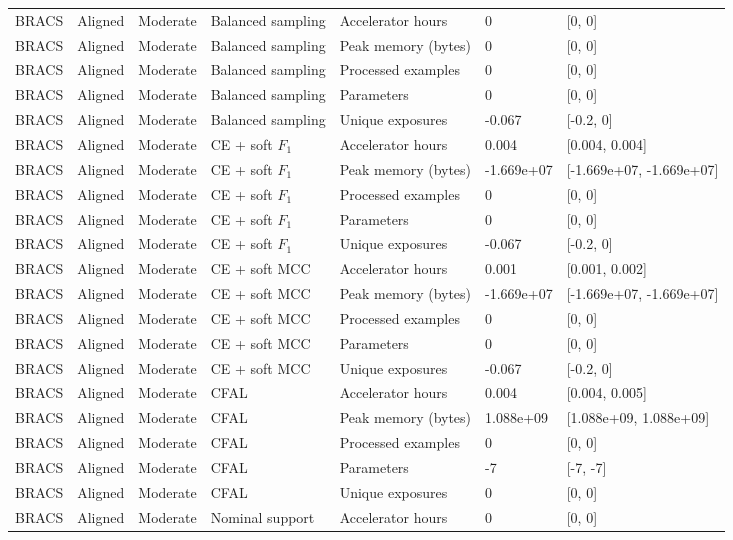 \begin{longtable}{lllllll}
BRACS & Aligned & Moderate & Balanced sampling & Accelerator hours & 0 & [0, 0] \\
BRACS & Aligned & Moderate & Balanced sampling & Peak memory (bytes) & 0 & [0, 0] \\
BRACS & Aligned & Moderate & Balanced sampling & Processed examples & 0 & [0, 0] \\
BRACS & Aligned & Moderate & Balanced sampling & Parameters & 0 & [0, 0] \\
BRACS & Aligned & Moderate & Balanced sampling & Unique exposures & -0.067 & [-0.2, 0] \\
BRACS & Aligned & Moderate & CE + soft $F_1$ & Accelerator hours & 0.004 & [0.004, 0.004] \\
BRACS & Aligned & Moderate & CE + soft $F_1$ & Peak memory (bytes) & -1.669e+07 & [-1.669e+07, -1.669e+07] \\
BRACS & Aligned & Moderate & CE + soft $F_1$ & Processed examples & 0 & [0, 0] \\
BRACS & Aligned & Moderate & CE + soft $F_1$ & Parameters & 0 & [0, 0] \\
BRACS & Aligned & Moderate & CE + soft $F_1$ & Unique exposures & -0.067 & [-0.2, 0] \\
BRACS & Aligned & Moderate & CE + soft MCC & Accelerator hours & 0.001 & [0.001, 0.002] \\
BRACS & Aligned & Moderate & CE + soft MCC & Peak memory (bytes) & -1.669e+07 & [-1.669e+07, -1.669e+07] \\
BRACS & Aligned & Moderate & CE + soft MCC & Processed examples & 0 & [0, 0] \\
BRACS & Aligned & Moderate & CE + soft MCC & Parameters & 0 & [0, 0] \\
BRACS & Aligned & Moderate & CE + soft MCC & Unique exposures & -0.067 & [-0.2, 0] \\
BRACS & Aligned & Moderate & CFAL & Accelerator hours & 0.004 & [0.004, 0.005] \\
BRACS & Aligned & Moderate & CFAL & Peak memory (bytes) & 1.088e+09 & [1.088e+09, 1.088e+09] \\
BRACS & Aligned & Moderate & CFAL & Processed examples & 0 & [0, 0] \\
BRACS & Aligned & Moderate & CFAL & Parameters & -7 & [-7, -7] \\
BRACS & Aligned & Moderate & CFAL & Unique exposures & 0 & [0, 0] \\
BRACS & Aligned & Moderate & Nominal support & Accelerator hours & 0 & [0, 0] \\

\end{longtable}

